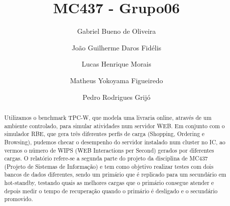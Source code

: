 \documentclass[11pt,twoside]{article}
\begin{document}
%

%



\TRMakeCover

%
\pagestyle{myheadings}

%
\title{MC437 - Grupo06}

\author{Gabriel Bueno de Oliveira \and
Jo{\~a}o Guilherme Daros Fid{\'e}lis \and
Lucas Henrique Morais \and
Matheus Yokoyama Figueiredo \and Pedro Rodrigues Grij{\'o}}
\date{}

\maketitle


\begin{abstract}
\setlength{\parindent}{4ex}
Utilizamos o benchmark TPC-W, que modela uma livraria online, atrav\'es de um ambiente controlado, para simular atividades num servidor WEB. Em conjunto com o simulador RBE, que gera tr\^es diferentes perfis de carga (Shopping, Ordering e Browsing), pudemos checar o desempenho do servidor instalado num cluster no IC, ao vermos o n\'umero de WIPS (WEB Interactions per Second) gerados por diferentes cargas.
O relat\'orio refere-se a segunda parte do projeto da disciplina de MC437 (Projeto de Sistemas de Informa\c{c}\~ao) e tem como objetivo realizar testes com dois bancos de dados diferentes, sendo um primário que é replicado para um secundário em hot-standby, testando quais as melhores cargas que o primário consegue atender e depois medir o tempo de recuperação quando o primário é desligado e o secundário promovido.
\end{abstract}
\end{document}
